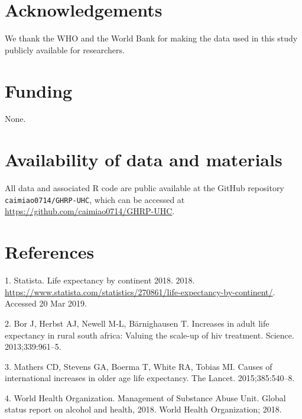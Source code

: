\documentclass[]{elsarticle} %
\begin{document}
\hypertarget{acknowledgements}{%
\section*{Acknowledgements}\label{acknowledgements}}

We thank the WHO and the World Bank for making the data used in this study publicly available for researchers.

\hypertarget{funding}{%
\section*{Funding}\label{funding}}

None.

\hypertarget{availability-of-data-and-materials}{%
\section*{Availability of data and materials}\label{availability-of-data-and-materials}}

All data and associated R code are public available at the GitHub repository \texttt{caimiao0714/GHRP-UHC}, which can be accessed at \url{https://github.com/caimiao0714/GHRP-UHC}.

\hypertarget{references}{%
\section*{References}\label{references}}

\hypertarget{refs}{}
\leavevmode\hypertarget{ref-Statista}{}%
1. Statista. Life expectancy by continent 2018. 2018. \url{https://www.statista.com/statistics/270861/life-expectancy-by-continent/}. Accessed 20 Mar 2019.

\leavevmode\hypertarget{ref-bor2013increases}{}%
2. Bor J, Herbst AJ, Newell M-L, Bärnighausen T. Increases in adult life expectancy in rural south africa: Valuing the scale-up of hiv treatment. Science. 2013;339:961--5.

\leavevmode\hypertarget{ref-mathers2015causes}{}%
3. Mathers CD, Stevens GA, Boerma T, White RA, Tobias MI. Causes of international increases in older age life expectancy. The Lancet. 2015;385:540--8.

\leavevmode\hypertarget{ref-world2018global}{}%
4. World Health Organization. Management of Substance Abuse Unit. Global status report on alcohol and health, 2018. World Health Organization; 2018.
\end{document}
